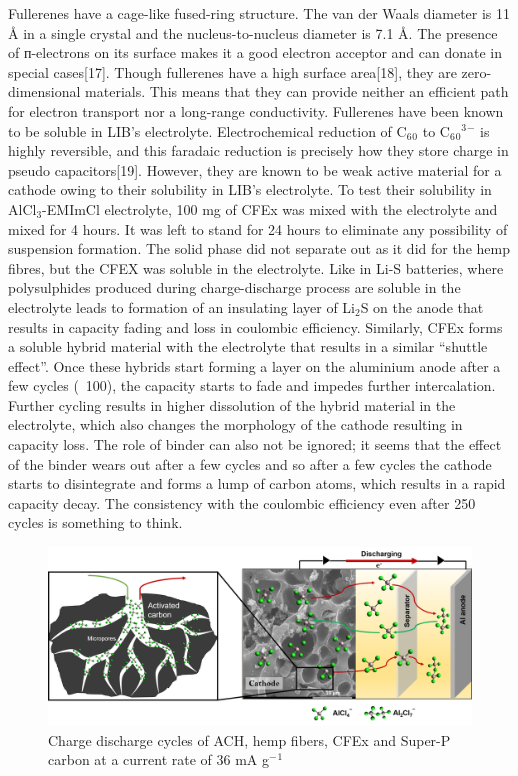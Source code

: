 \documentclass{article}
\begin{document}
Fullerenes have a cage-like fused-ring structure. The van der Waals diameter is 11 Å in a single crystal and the nucleus-to-nucleus diameter is 7.1 Å. The presence of ᴨ-electrons on its surface makes it a good electron acceptor and can donate in special cases[17]. Though fullerenes have a high surface area[18], they are zero-dimensional materials. This means that they can provide neither an efficient path for electron transport nor a long-range conductivity. Fullerenes have been known to be soluble in LIB’s electrolyte. Electrochemical reduction of C$_6{_0}$ to C$_6{_0}{^3}{^-}$ is highly reversible, and this faradaic reduction is precisely how they store charge in pseudo capacitors[19]. However, they are known to be weak active material for a cathode owing to their solubility in LIB’s electrolyte. To test their solubility in AlCl$_3$-EMImCl electrolyte, 100 mg of CFEx was mixed with the electrolyte and mixed for 4 hours. It was left to stand for 24 hours to eliminate any possibility of suspension formation. The solid phase did not separate out as it did for the hemp fibres, but the CFEX was soluble in the electrolyte. Like in Li-S batteries, where polysulphides produced during charge-discharge process are soluble in the electrolyte leads to formation of an insulating layer of Li$_2$S on the anode that results in capacity fading and loss in coulombic efficiency. Similarly, CFEx forms a soluble hybrid material with the electrolyte that results in a similar “shuttle effect”. Once these hybrids start forming a layer on the aluminium anode after a few cycles (~100), the capacity starts to fade and impedes further intercalation. Further cycling results in higher dissolution of the hybrid material in the electrolyte, which also changes the morphology of the cathode resulting in capacity loss. The role of binder can also not be ignored; it seems that the effect of the binder wears out after a few cycles and so after a few cycles the cathode starts to disintegrate and forms a lump of carbon atoms, which results in a rapid capacity decay. The consistency with the coulombic efficiency even after 250 cycles is something to think.   
\begin{figure}[t]
  \centering
  \includegraphics[width=\textwidth]{figures/scheme1}
    \caption{Charge discharge cycles of ACH, hemp fibers, CFEx and Super-P carbon at a current rate of 36 mA g$^-{^1}$}
  \label{figures:fig1}
\end{figure}
\end{document}
